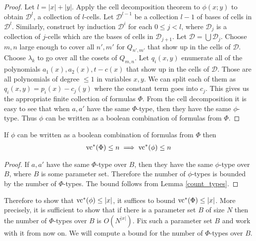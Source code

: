 \documentclass{amsart}
\newcommand{\DD}{\mathscr D}
\begin{document}
\begin{proof}
  Let $l = |x| + |y|$.
  Apply the cell decomposition theorem to $\phi(x; y)$ to obtain $\DD^l$, a collection of $l$-cells.
  Let $\DD^{l-1}$ be a collection $l-1$ of bases of cells in $\DD^l$.
  Similarly, construct by induction $\DD^i$ for each $0 \leq j < l$,
  where $\DD_j$ is a collection of $j$-cells which are the bases of cells in $\DD_{j+1}$.
  Let $\DD = \bigcup \DD_j$.
  Choose $m,n$ large enough to cover all $n', m'$ for $Q_{n',m'}$ that show up in the cells of $\DD$.
  Choose $\lambda_k$ to go over all the cosets of $Q_{m,n}$.
  Let $q_i(x, y)$ enumerate all of the polynomials $a_1(x), a_2(x), t - c(x)$ that show up in the cells of $\DD$.
  Those are all polynomials of degree $\leq 1$ in variables $x, y$.
  We can split each of them as $q_i(x,y) = p_i(x) - c_j(y)$ where the constant term goes into $c_j$.
  This gives us the appropriate finite collection of formulas $\Phi$.
  From the cell decomposition it is easy to see that when $a, a'$ have the same $\Phi$-type,
  then they have the same $\phi$-type.
  Thus $\phi$ can be written as a boolean combination of formulas from $\Phi$.
\end{proof}

\begin{Lemma}
  If $\phi$ can be written as a boolean combination of formulas from $\Phi$ then
  \begin{align*}
    \operatorname{vc}^* (\Phi) \leq n \implies \operatorname{vc}^* (\phi) \leq n
  \end{align*}
\end{Lemma}
\begin{proof}
  If $a,a'$ have the same $\Phi$-type over $B$, then they have the same $\phi$-type over $B$, where $B$ is some parameter set.
  Therefore the number of $\phi$-types is bounded by the number of $\Phi$-types.
  The bound follows from Lemma \ref{count_types}.
\end{proof}

Therefore to show that $\operatorname{vc}^*(\phi) \leq |x|$, it suffices to bound $\operatorname{vc}^*(\Phi) \leq |x|$.
More precisely, it is sufficient to show that if there is a parameter set $B$ of size $N$
then the number of $\Phi$-types over $B$ is $O(N^{|x|})$.
Fix such a parameter set $B$ and work with it from now on.
We will compute a bound for the number of $\Phi$-types over $B$.
\end{document}
